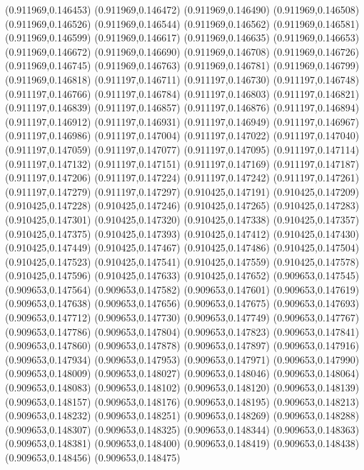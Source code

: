 (0.911969,0.146453)
(0.911969,0.146472)
(0.911969,0.146490)
(0.911969,0.146508)
(0.911969,0.146526)
(0.911969,0.146544)
(0.911969,0.146562)
(0.911969,0.146581)
(0.911969,0.146599)
(0.911969,0.146617)
(0.911969,0.146635)
(0.911969,0.146653)
(0.911969,0.146672)
(0.911969,0.146690)
(0.911969,0.146708)
(0.911969,0.146726)
(0.911969,0.146745)
(0.911969,0.146763)
(0.911969,0.146781)
(0.911969,0.146799)
(0.911969,0.146818)
(0.911197,0.146711)
(0.911197,0.146730)
(0.911197,0.146748)
(0.911197,0.146766)
(0.911197,0.146784)
(0.911197,0.146803)
(0.911197,0.146821)
(0.911197,0.146839)
(0.911197,0.146857)
(0.911197,0.146876)
(0.911197,0.146894)
(0.911197,0.146912)
(0.911197,0.146931)
(0.911197,0.146949)
(0.911197,0.146967)
(0.911197,0.146986)
(0.911197,0.147004)
(0.911197,0.147022)
(0.911197,0.147040)
(0.911197,0.147059)
(0.911197,0.147077)
(0.911197,0.147095)
(0.911197,0.147114)
(0.911197,0.147132)
(0.911197,0.147151)
(0.911197,0.147169)
(0.911197,0.147187)
(0.911197,0.147206)
(0.911197,0.147224)
(0.911197,0.147242)
(0.911197,0.147261)
(0.911197,0.147279)
(0.911197,0.147297)
(0.910425,0.147191)
(0.910425,0.147209)
(0.910425,0.147228)
(0.910425,0.147246)
(0.910425,0.147265)
(0.910425,0.147283)
(0.910425,0.147301)
(0.910425,0.147320)
(0.910425,0.147338)
(0.910425,0.147357)
(0.910425,0.147375)
(0.910425,0.147393)
(0.910425,0.147412)
(0.910425,0.147430)
(0.910425,0.147449)
(0.910425,0.147467)
(0.910425,0.147486)
(0.910425,0.147504)
(0.910425,0.147523)
(0.910425,0.147541)
(0.910425,0.147559)
(0.910425,0.147578)
(0.910425,0.147596)
(0.910425,0.147633)
(0.910425,0.147652)
(0.909653,0.147545)
(0.909653,0.147564)
(0.909653,0.147582)
(0.909653,0.147601)
(0.909653,0.147619)
(0.909653,0.147638)
(0.909653,0.147656)
(0.909653,0.147675)
(0.909653,0.147693)
(0.909653,0.147712)
(0.909653,0.147730)
(0.909653,0.147749)
(0.909653,0.147767)
(0.909653,0.147786)
(0.909653,0.147804)
(0.909653,0.147823)
(0.909653,0.147841)
(0.909653,0.147860)
(0.909653,0.147878)
(0.909653,0.147897)
(0.909653,0.147916)
(0.909653,0.147934)
(0.909653,0.147953)
(0.909653,0.147971)
(0.909653,0.147990)
(0.909653,0.148009)
(0.909653,0.148027)
(0.909653,0.148046)
(0.909653,0.148064)
(0.909653,0.148083)
(0.909653,0.148102)
(0.909653,0.148120)
(0.909653,0.148139)
(0.909653,0.148157)
(0.909653,0.148176)
(0.909653,0.148195)
(0.909653,0.148213)
(0.909653,0.148232)
(0.909653,0.148251)
(0.909653,0.148269)
(0.909653,0.148288)
(0.909653,0.148307)
(0.909653,0.148325)
(0.909653,0.148344)
(0.909653,0.148363)
(0.909653,0.148381)
(0.909653,0.148400)
(0.909653,0.148419)
(0.909653,0.148438)
(0.909653,0.148456)
(0.909653,0.148475)
